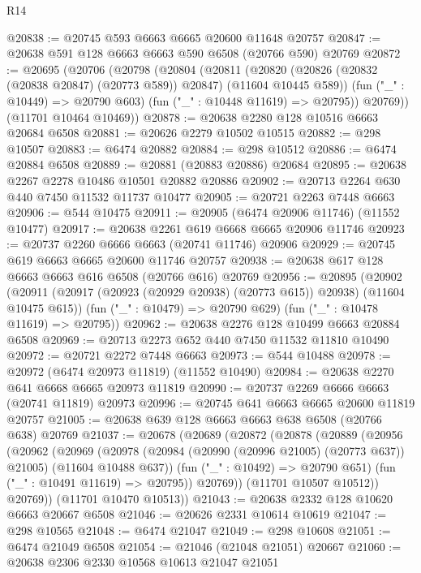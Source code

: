 \begin{lexlean}{R14}
\begin{coremodule}
@20838 := @20745 @593 @6663 @6665 @20600 @11648 @20757
@20847 := @20638 @591 @128 @6663 @6663 @590 @6508 (@20766 @590) @20769
@20872 := @20695
    (@20706
      (@20798
        (@20804
          (@20811
            (@20820 (@20826 (@20832 (@20838 @20847) (@20773 @589)) @20847) (@11604 @10445 @589))
            (fun ("_" : @10449) => @20790 @603)
            (fun ("_" : @10448 @11619) => @20795))
          @20769))
      (@11701 @10464 @10469))
@20878 := @20638 @2280 @128 @10516 @6663 @20684 @6508
@20881 := @20626 @2279 @10502 @10515
@20882 := @298 @10507
@20883 := @6474 @20882
@20884 := @298 @10512
@20886 := @6474 @20884 @6508
@20889 := @20881 (@20883 @20886) @20684
@20895 := @20638 @2267 @2278 @10486 @10501 @20882 @20886
@20902 := @20713 @2264 @630 @440 @7450 @11532 @11737 @10477
@20905 := @20721 @2263 @7448 @6663
@20906 := @544 @10475
@20911 := @20905 (@6474 @20906 @11746) (@11552 @10477)
@20917 := @20638 @2261 @619 @6668 @6665 @20906 @11746
@20923 := @20737 @2260 @6666 @6663 (@20741 @11746) @20906
@20929 := @20745 @619 @6663 @6665 @20600 @11746 @20757
@20938 := @20638 @617 @128 @6663 @6663 @616 @6508 (@20766 @616) @20769
@20956 := @20895
    (@20902
      (@20911 (@20917 (@20923 (@20929 @20938) (@20773 @615)) @20938) (@11604 @10475 @615))
      (fun ("_" : @10479) => @20790 @629)
      (fun ("_" : @10478 @11619) => @20795))
@20962 := @20638 @2276 @128 @10499 @6663 @20884 @6508
@20969 := @20713 @2273 @652 @440 @7450 @11532 @11810 @10490
@20972 := @20721 @2272 @7448 @6663
@20973 := @544 @10488
@20978 := @20972 (@6474 @20973 @11819) (@11552 @10490)
@20984 := @20638 @2270 @641 @6668 @6665 @20973 @11819
@20990 := @20737 @2269 @6666 @6663 (@20741 @11819) @20973
@20996 := @20745 @641 @6663 @6665 @20600 @11819 @20757
@21005 := @20638 @639 @128 @6663 @6663 @638 @6508 (@20766 @638) @20769
@21037 := @20678
    (@20689
      (@20872
        (@20878
          (@20889
            (@20956
              (@20962
                (@20969
                  (@20978
                    (@20984 (@20990 (@20996 @21005) (@20773 @637)) @21005)
                    (@11604 @10488 @637))
                  (fun ("_" : @10492) => @20790 @651)
                  (fun ("_" : @10491 @11619) => @20795))
                @20769))
            (@11701 @10507 @10512))
          @20769))
      (@11701 @10470 @10513))
@21043 := @20638 @2332 @128 @10620 @6663 @20667 @6508
@21046 := @20626 @2331 @10614 @10619
@21047 := @298 @10565
@21048 := @6474 @21047
@21049 := @298 @10608
@21051 := @6474 @21049 @6508
@21054 := @21046 (@21048 @21051) @20667
@21060 := @20638 @2306 @2330 @10568 @10613 @21047 @21051

\end{coremodule}
\end{lexlean}
